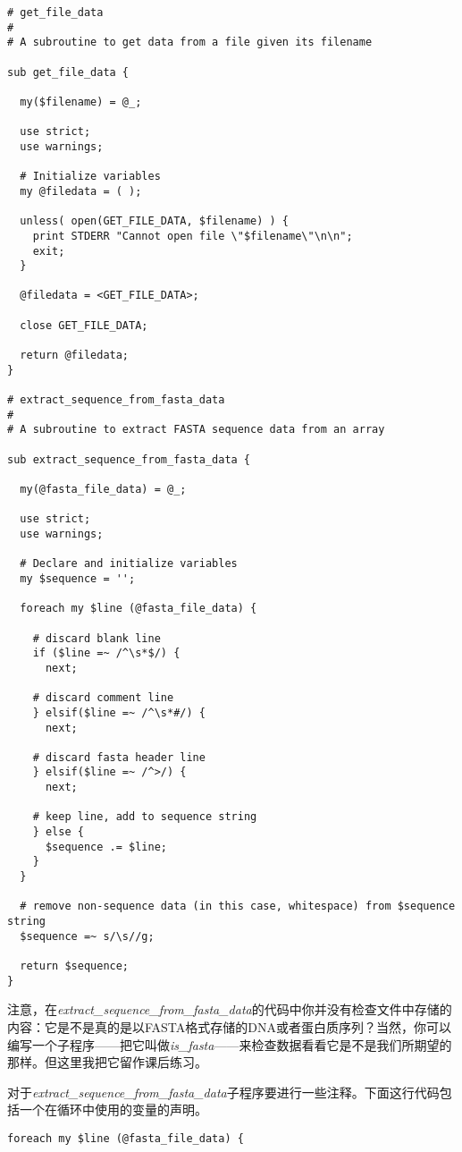 \begin{lstlisting}
# get_file_data
#
# A subroutine to get data from a file given its filename

sub get_file_data {

  my($filename) = @_;

  use strict;
  use warnings;

  # Initialize variables
  my @filedata = ( );

  unless( open(GET_FILE_DATA, $filename) ) {
    print STDERR "Cannot open file \"$filename\"\n\n";
    exit;
  }

  @filedata = <GET_FILE_DATA>;

  close GET_FILE_DATA;

  return @filedata;
}

# extract_sequence_from_fasta_data
#
# A subroutine to extract FASTA sequence data from an array

sub extract_sequence_from_fasta_data {

  my(@fasta_file_data) = @_;

  use strict;
  use warnings;

  # Declare and initialize variables
  my $sequence = '';

  foreach my $line (@fasta_file_data) {

    # discard blank line
    if ($line =~ /^\s*$/) {
      next;

    # discard comment line
    } elsif($line =~ /^\s*#/) {
      next;

    # discard fasta header line
    } elsif($line =~ /^>/) {
      next;

    # keep line, add to sequence string
    } else {
      $sequence .= $line;
    }
  }

  # remove non-sequence data (in this case, whitespace) from $sequence string
  $sequence =~ s/\s//g;

  return $sequence;
}
\end{lstlisting}

注意，在\textit{extract\_sequence\_from\_fasta\_data}的代码中你并没有检查文件中存储的内容：它是不是真的是以FASTA格式存储的DNA或者蛋白质序列？当然，你可以编写一个子程序——把它叫做\textit{is\_fasta}——来检查数据看看它是不是我们所期望的那样。但这里我把它留作课后练习。

对于\textit{extract\_sequence\_from\_fasta\_data}子程序要进行一些注释。下面这行代码包括一个在循环中使用的变量的声明。

\begin{lstlisting}
foreach my $line (@fasta_file_data) {
\end{lstlisting}

